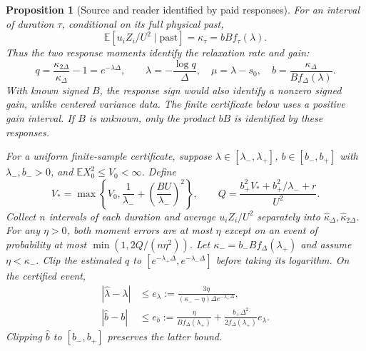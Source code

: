 \documentclass[12pt,a4paper]{article}
\newtheorem{proposition}[theorem]{Proposition}
\newcommand{\E}{\mathbb E}
\begin{document}
\begin{proposition}[Source and reader identified by paid responses]
\label{prop:active-reference}
For an interval of duration $\tau$, conditional on its full physical
past,
\[
 \E[u_iZ_i/U^2\mid\text{past}]
   =\kappa_\tau=bBf_\tau(\lambda).
\]
Thus the two response moments identify the relaxation rate and gain:
\begin{equation}\label{eq:active-identification}
 q=\frac{\kappa_{2\Delta}}{\kappa_\Delta}-1=e^{-\lambda\Delta},
 \qquad
 \lambda=-\frac{\log q}{\Delta},\quad
 \mu=\lambda-s_0,\quad
 b=\frac{\kappa_\Delta}{Bf_\Delta(\lambda)}.
\end{equation}
With known signed $B$, the response sign would also identify a
nonzero signed gain, unlike centered variance data. The finite
certificate below uses a positive gain interval. If $B$ is unknown,
only the product $bB$ is identified by these responses.

For a uniform finite-sample certificate, suppose
$\lambda\in[\lambda_-,\lambda_+]$, $b\in[b_-,b_+]$ with
$\lambda_-,b_->0$, and $\E X_0^2\le V_0<\infty$. Define
\[
 V_*=\max\left\{V_0,\frac1{\lambda_-}
                         +\left(\frac{BU}{\lambda_-}\right)^2\right\},
 \qquad
 Q=\frac{b_+^2V_*+b_+^2/\lambda_-+r}{U^2}.
\]
Collect $n$ intervals of each duration and average $u_iZ_i/U^2$
separately into $\widehat\kappa_\Delta,\widehat\kappa_{2\Delta}$.
For any $\eta>0$, both moment errors are at most $\eta$ except on
an event of probability at most $\min(1,2Q/(n\eta^2))$.
Let $\kappa_-=b_-Bf_\Delta(\lambda_+)$ and assume $\eta<\kappa_-$.
Clip the estimated $q$ to
$[e^{-\lambda_+\Delta},e^{-\lambda_-\Delta}]$ before taking its
logarithm. On the certified event,
\begin{align}
 |\widehat\lambda-\lambda|
 &\le e_\lambda:=
 \frac{3\eta}{(\kappa_--\eta)\Delta e^{-\lambda_+\Delta}},
 \label{eq:active-lambda}\\
 |\widehat b-b|
 &\le e_b:=\frac{\eta}{Bf_\Delta(\lambda_+)}
 +\frac{b_+\Delta^2}{2f_\Delta(\lambda_+)}e_\lambda .
 \label{eq:active-gain}
\end{align}
Clipping $\widehat b$ to $[b_-,b_+]$ preserves the latter bound.
\end{proposition}
\end{document}
